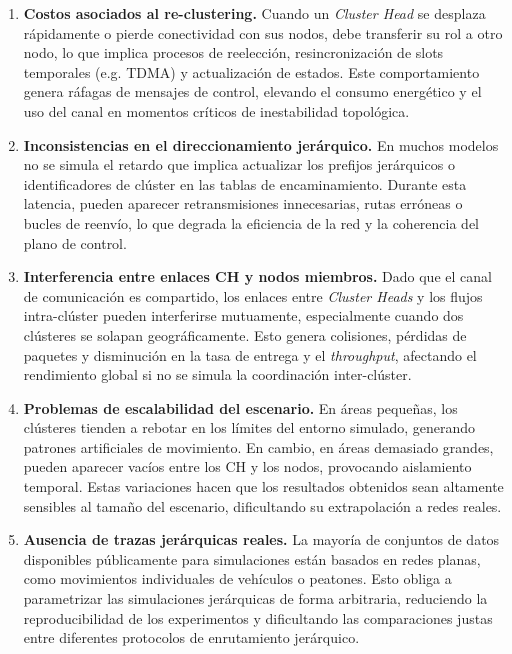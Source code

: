 \documentclass{article}
\begin{document}
\begin{enumerate}
    \item \textbf{Costos asociados al re-clustering.} 
    Cuando un \textit{Cluster Head} se desplaza rápidamente o pierde conectividad con sus nodos, debe transferir su rol a otro nodo, lo que implica procesos de reelección, resincronización de slots temporales (e.g. TDMA) y actualización de estados. Este comportamiento genera ráfagas de mensajes de control, elevando el consumo energético y el uso del canal en momentos críticos de inestabilidad topológica.

    \item \textbf{Inconsistencias en el direccionamiento jerárquico.} 
    En muchos modelos no se simula el retardo que implica actualizar los prefijos jerárquicos o identificadores de clúster en las tablas de encaminamiento. Durante esta latencia, pueden aparecer retransmisiones innecesarias, rutas erróneas o bucles de reenvío, lo que degrada la eficiencia de la red y la coherencia del plano de control.

    \item \textbf{Interferencia entre enlaces CH y nodos miembros.} 
    Dado que el canal de comunicación es compartido, los enlaces entre \textit{Cluster Heads} y los flujos intra-clúster pueden interferirse mutuamente, especialmente cuando dos clústeres se solapan geográficamente. Esto genera colisiones, pérdidas de paquetes y disminución en la tasa de entrega y el \textit{throughput}, afectando el rendimiento global si no se simula la coordinación inter-clúster.

    \item \textbf{Problemas de escalabilidad del escenario.} 
    En áreas pequeñas, los clústeres tienden a rebotar en los límites del entorno simulado, generando patrones artificiales de movimiento. En cambio, en áreas demasiado grandes, pueden aparecer vacíos entre los CH y los nodos, provocando aislamiento temporal. Estas variaciones hacen que los resultados obtenidos sean altamente sensibles al tamaño del escenario, dificultando su extrapolación a redes reales.

    \item \textbf{Ausencia de trazas jerárquicas reales.} 
    La mayoría de conjuntos de datos disponibles públicamente para simulaciones están basados en redes planas, como movimientos individuales de vehículos o peatones. Esto obliga a parametrizar las simulaciones jerárquicas de forma arbitraria, reduciendo la reproducibilidad de los experimentos y dificultando las comparaciones justas entre diferentes protocolos de enrutamiento jerárquico.

\end{enumerate}
\end{document}
